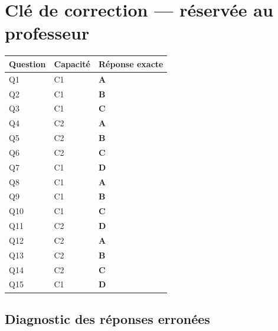 \ifnxVersionProfesseur
\clearpage
\section*{Clé de correction — réservée au professeur}

\begin{center}
\begin{tabular}{lll}
\hline
Question & Capacité & Réponse exacte \\
\hline
Q1 & C1 & \textbf{A} \\
Q2 & C1 & \textbf{B} \\
Q3 & C1 & \textbf{C} \\
Q4 & C2 & \textbf{A} \\
Q5 & C2 & \textbf{B} \\
Q6 & C2 & \textbf{C} \\
Q7 & C1 & \textbf{D} \\
Q8 & C1 & \textbf{A} \\
Q9 & C1 & \textbf{B} \\
Q10 & C1 & \textbf{C} \\
Q11 & C2 & \textbf{D} \\
Q12 & C2 & \textbf{A} \\
Q13 & C2 & \textbf{B} \\
Q14 & C2 & \textbf{C} \\
Q15 & C1 & \textbf{D} \\
\hline
\end{tabular}
\end{center}

\subsection*{Diagnostic des réponses erronées}

